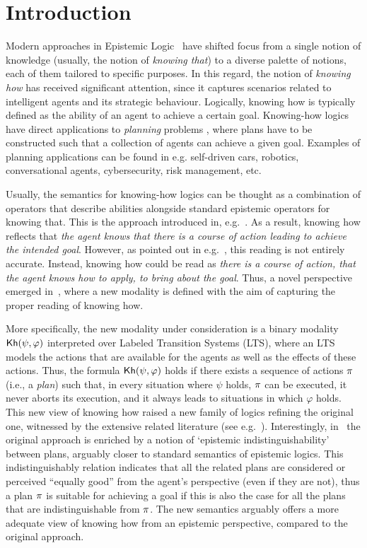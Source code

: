 \section{Introduction}
\label{sec:intro}

Modern approaches in Epistemic Logic~\cite{Hintikka:1962} have shifted focus from a single notion of knowledge (usually, the notion of \emph{knowing that}) to a diverse palette of notions, each of them tailored to specific purposes. In this regard, the notion of \emph{knowing how} has received significant attention, since it captures scenarios related to intelligent agents and its strategic behaviour. Logically, knowing how is typically defined as the ability of an agent to achieve a certain goal.  Knowing-how logics have direct applications to \emph{planning} problems \cite{Stuart21},  where  plans have to be constructed such that a collection of agents can achieve a given goal.  Examples of planning applications can be found in e.g. self-driven cars,  robotics,  conversational agents,  cybersecurity,  risk management,  etc.

Usually,  the semantics for knowing-how logics can be thought as a combination of operators that describe abilities alongside standard epistemic operators for knowing that.  This is the approach introduced in, e.g.~\cite{Mccarthy69,Moore85,Les00,Hoek00,HerzigT06}. As a result,  knowing how reflects that \emph{the agent knows that there is a course of action leading to achieve the intended goal}. However,  as pointed out in e.g.~\cite{JamrogaA07,Herzig15}, this reading is not entirely accurate.  Instead, knowing how could be read as \emph{there is a course of action, that the agent knows how to apply, to bring about the goal}. Thus, a novel perspective emerged in~\cite{Wang15lori,Wang16,Wang2016}, where a new modality is defined with the aim of capturing the proper reading of knowing how. 

More specifically, the new modality under consideration is a binary modality ${\mathsf{Kh}}(\psi,\varphi)$ interpreted over Labeled Transition Systems (LTS), where an LTS models the  actions that are available for the agents as well as the effects of these actions. Thus,  the formula ${\mathsf{Kh}}(\psi,\varphi)$ holds if there exists a sequence of actions $\pi$ (i.e., a \emph{plan}) such that,  in every situation where $\psi$ holds, $\pi$ can be executed, it never aborts its execution, and it always leads to situations in which $\varphi$ holds. This new view of knowing how raised a new family of logics refining the original one, witnessed by the extensive related literature (see e.g.~\cite{LiWang17,Li17,FervariHLW17,NaumovT19,Naumov2018a}). Interestingly, in~\cite{AFSVQ21,AFSVQ23} the original approach is enriched by a notion of `epistemic indistinguishability' between plans, arguably closer to standard semantics of epistemic logics. This indistinguishably relation indicates that all the related plans are considered or perceived ``equally good''
from the agent's perspective (even if they are not), thus a plan $\pi$ is suitable for achieving a goal if this is also the case for all the plans that are indistinguishable from $\pi$. The new semantics arguably offers a more adequate view of knowing how from an epistemic perspective, compared to the original approach.

